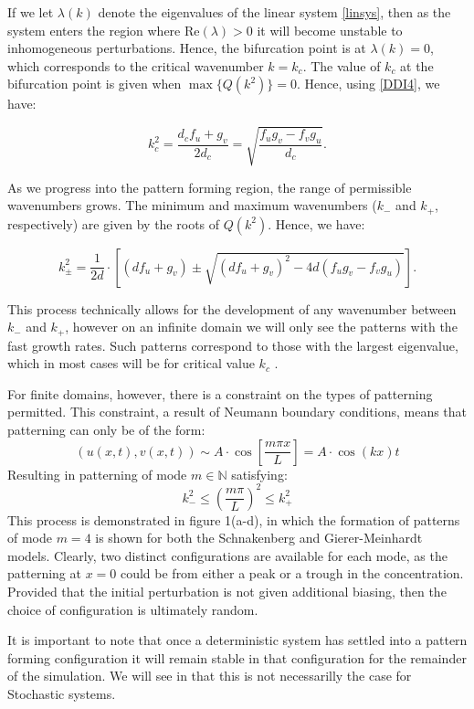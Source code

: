 \documentclass[12pt]{article}
\begin{document}
If we let $\lambda(k)$ denote the eigenvalues of the linear system \eqref{linsys}, then as the system enters the region where $\text{Re}(\lambda)>0$ it will become unstable to inhomogeneous perturbations. Hence, the bifurcation point is at $\lambda(k) = 0$, which corresponds to the critical wavenumber $k = k_c$. The value of $k_c$ at the bifurcation point is given when $\max\lbrace Q(k^2)\rbrace = 0$. Hence, using \eqref{DDI4}, we have:

$$k_c^2 = \frac{d_c f_u + g_v}{2d_c} = \sqrt{\frac{f_ug_v - f_vg_u}{d_c}}.$$

As we progress into the pattern forming region, the range of permissible wavenumbers grows. The minimum and maximum wavenumbers ($k_-$ and $k_+$, respectively) are given by the roots of $Q(k^2)$. Hence, we have:

$$k^2_\pm = \frac{1}{2d}\cdot\left[(df_u + g_v)\pm\sqrt{(df_u + g_v)^2-4d(f_ug_v-f_vg_u)}\right].$$

This process technically allows for the development of any wavenumber between $k_{-}$ and $k_{+}$, however on an infinite domain we will only see the patterns with the fast growth rates. Such patterns correspond to those with the largest eigenvalue, which in most cases will be for critical value $k_c$ \cite{Murray}. 

For finite domains, however, there is a constraint on the types of patterning permitted. This constraint, a result of Neumann boundary conditions, means that patterning can only be of the form:
\begin{equation*}
    (u(x,t), v(x,t)) \sim A \cdot \cos \left[\frac{m\pi x}{L}\right] = A \cdot \cos (kx)t
\end{equation*}
Resulting in patterning of mode $m \in \mathbb{N}$ satisfying:
\begin{equation}
k^2_-\leq\left(\frac{m\pi}{L}\right)^2\leq k^2_+
\end{equation}
This process is demonstrated in figure 1(a-d), in which the formation of patterns of mode $m=4$ is shown for both the Schnakenberg and Gierer-Meinhardt models. Clearly, two distinct configurations are available for each mode, as the patterning at $x=0$ could be from either a peak or a trough in the concentration. Provided that the initial perturbation is not given additional biasing, then the choice of configuration is ultimately random. 

It is important to note that once a deterministic system has settled into a pattern forming configuration it will remain stable in that configuration for the remainder of the simulation. We will see in  that this is not necessarilly the case for Stochastic systems. 
\end{document}
